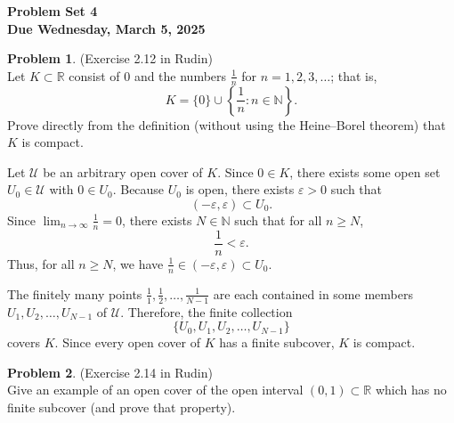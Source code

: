 \documentclass[12pt,oneside]{article}
\theoremstyle{definition}
\newtheorem{problem}{Problem}
\begin{document}
\begin{center}
  \bf \Large
  Problem Set 4 \\[0.5em]
  \large
  Due Wednesday, March 5, 2025
\end{center}

\bigskip

\begin{problem}
(Exercise 2.12 in Rudin)\\
Let \(K \subset \mathbb{R}\) consist of \(0\) and the numbers \(\frac{1}{n}\) for \(n = 1, 2, 3, \ldots\); that is,
\[
K = \{0\} \cup \left\{\frac{1}{n} : n \in \mathbb{N}\right\}.
\]
Prove directly from the definition (without using the Heine--Borel theorem) that \(K\) is compact.
\end{problem}

\newpage
\begin{solution}
Let \(\mathcal{U}\) be an arbitrary open cover of \(K\). Since \(0 \in K\), there exists some open set \(U_0 \in \mathcal{U}\) with \(0 \in U_0\). Because \(U_0\) is open, there exists \(\varepsilon > 0\) such that
\[
(-\varepsilon, \varepsilon) \subset U_0.
\]
Since \(\lim_{n\to\infty} \frac{1}{n} = 0\), there exists \(N \in \mathbb{N}\) such that for all \(n \ge N\),
\[
\frac{1}{n} < \varepsilon.
\]
Thus, for all \(n \ge N\), we have \(\frac{1}{n} \in (-\varepsilon, \varepsilon) \subset U_0\).

The finitely many points \(\frac{1}{1}, \frac{1}{2}, \ldots, \frac{1}{N-1}\) are each contained in some members \(U_1, U_2, \ldots, U_{N-1}\) of \(\mathcal{U}\). Therefore, the finite collection
\[
\{U_0, U_1, U_2, \ldots, U_{N-1}\}
\]
covers \(K\). Since every open cover of \(K\) has a finite subcover, \(K\) is compact.
\end{solution}

\bigskip

\newpage
\begin{problem}
(Exercise 2.14 in Rudin)\\
Give an example of an open cover of the open interval \((0,1) \subset \mathbb{R}\) which has no finite subcover (and prove that property).
\end{problem}
\end{document}
